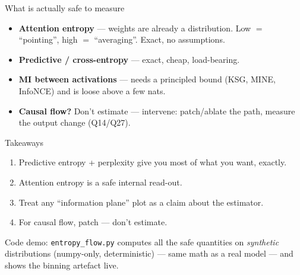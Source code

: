 \documentclass[aspectratio=169,11pt]{beamer}
\begin{document}
\begin{frame}{What is actually safe to measure}
\begin{itemize}
  \item \textbf{Attention entropy} --- weights are already a distribution.
    Low $=$ ``pointing'', high $=$ ``averaging''. Exact, no assumptions.
  \item \textbf{Predictive / cross-entropy} --- exact, cheap, load-bearing.
  \item \textbf{MI between activations} --- needs a principled bound (KSG, MINE,
    InfoNCE) and is loose above a few nats.
  \item \textbf{Causal flow?} Don't estimate --- \alert{intervene}: patch/ablate
    the path, measure the output change (Q14/Q27).
\end{itemize}
\end{frame}

\begin{frame}{Takeaways}
\begin{enumerate}
  \item Predictive entropy + perplexity give you most of what you want, exactly.
  \item Attention entropy is a safe internal read-out.
  \item Treat any ``information plane'' plot as a claim about the estimator.
  \item For causal flow, patch --- don't estimate.
\end{enumerate}
\vspace{0.8em}
\centering\small\color{Accent} Code demo: \texttt{entropy\_flow.py} computes all the
safe quantities on \emph{synthetic} distributions (numpy-only, deterministic) ---
same math as a real model --- and shows the binning artefact live.
\end{frame}
\end{document}

